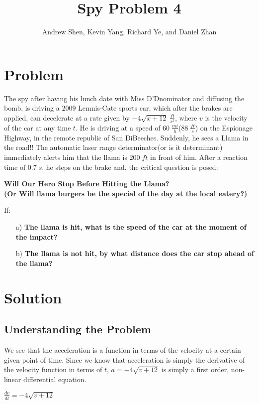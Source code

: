 \documentclass{article}
\title{Spy Problem 4}
\author{Andrew Shen, Kevin Yang, Richard Ye, and Daniel Zhan}
\begin{document}
	\maketitle
	\section{Problem}
	The spy after having his lunch date with Miss D'Dnominator and diffusing the bomb, is driving a $2009$ Lemnis-Cate sports car, which after the brakes are applied, can decelerate at a rate given by $-4\sqrt{x+12}\;\frac{ft}{s^2}$, where $v$ is the velocity of the car at any time $t$. He is driving at a speed of $60\;\frac{mi}{h}$($88\;\frac{ft}{s}$) on the Espionage Highway, in the remote republic of San DiBeeches. Suddenly, he sees a Llama in the road!! The automatic laser range determinator(or is it determinant) immediately alerts him that the llama is $200\;ft$ in front of him. After a reaction time of $0.7\;s$, he steps on the brake and, the critical question is posed:
	\begin{center}
		\Large{\textbf{Will Our Hero Stop Before Hitting the Llama?}}
		\\
		\textbf{(Or Will llama burgers be the special of the day at the local eatery?)}
	\end{center}
	If:\\
	\begin{enumerate}
		\item[a)]\textbf{The llama is hit, what is the speed of the car at the moment of the impact?}
		\item[b)]\textbf{The llama is not hit, by what distance does the car stop ahead of the llama?}
	\end{enumerate}
	\section{Solution}
		\subsection{Understanding the Problem}
			We see that the acceleration is a function in terms of the velocity at a certain given point of time. Since we know that acceleration is simply the derivative of the velocity function in terms of $t$, $a=-4\sqrt{v+12}$ is simply a first order, non-linear differential equation. 
			\begin{center}
				$\frac{dv}{dt} = -4\sqrt{v+12}$
			\end{center}
\end{document}
